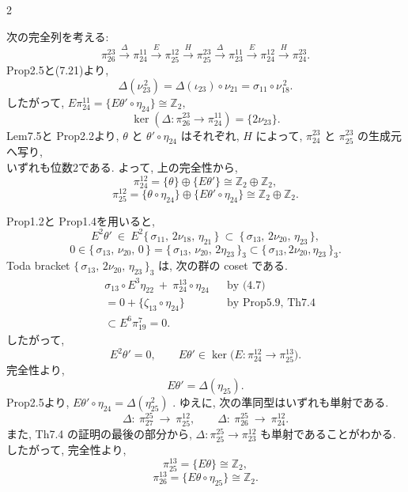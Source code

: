 \documentclass[10pt, leqno]{ltjsarticle}
\newcommand{\Ex}{E}        %
\newcommand{\toda}[1]{\{\,#1\,\}}              %
\newcommand{\todai}[2][]{\{\,#2\,\}_{#1}}      %
\newcommand{\gen}[1]{\{#1\}}       %
\newcommand{\pit}[2]{\pi_{#1}^{#2}}
\numberwithin{equation}{section}
\theoremstyle{plain}
\theoremstyle{definition}
\theoremstyle{remark}
\begin{document}
\begin{paracol}{2}

\noindent
次の完全列を考える:
\[
\pi_{26}^{23}\xrightarrow{\ \Delta\ }\pi_{24}^{11}\xrightarrow{\ \Ex\ }\pi_{25}^{12}
\xrightarrow{\ H\ }\pi_{25}^{23}\xrightarrow{\ \Delta\ }\pi_{23}^{11}
\xrightarrow{\ \Ex\ }\pi_{24}^{12}\xrightarrow{\ H\ }\pi_{24}^{23}.
\]
 Prop2.5と(7.21)より, 
\[
\Delta(\nu_{23}^{\,2})=\Delta(\iota_{23})\circ\nu_{21}=\sigma_{11}\circ\nu_{18}^{\,2}.
\]
したがって,
\(
\Ex\pi_{24}^{11}=\gen{\Ex\theta'\circ\eta_{24}}\cong\mathbb{Z}_2,
\)
\begin{equation}
\ker(\Delta:\pi_{26}^{23}\to\pi_{24}^{11})
= \gen{2\nu_{23}}.
\end{equation}
Lem7.5と Prop2.2より, \(\theta\) と \(\theta'\circ\eta_{24}\) はそれぞれ,
 \(H\) によって,
\(\pi_{24}^{23}\) と \(\pi_{25}^{23}\) の生成元へ写り, \\
いずれも位数2である. 
よって, 上の完全性から,
\[
\pi_{24}^{12}=\gen{\theta}\oplus\gen{\Ex\theta'}\cong\mathbb{Z}_2\oplus\mathbb{Z}_2,
\]
\[
\pi_{25}^{12}=\gen{\theta\circ\eta_{24}}\oplus\gen{\Ex\theta'\circ\eta_{24}}
\cong\mathbb{Z}_2\oplus\mathbb{Z}_2.
\]

 Prop1.2と Prop1.4を用いると,
\[
\Ex^{2}\theta'\ \in\ \Ex^{2}\toda{\sigma_{11},\,2\nu_{18},\,\eta_{21}}
\ \subset\ \toda{\sigma_{13},\,2\nu_{20},\,\eta_{23}},
\]
\[
0\in\toda{\sigma_{13},\,\nu_{20},\,0}
=\todai[3]{\sigma_{13},\,\nu_{20},\,2\eta_{23}}
\subset\todai[3]{\sigma_{13}, 2\nu_{20}, \eta_{23}}.
\]
Toda bracket  \(\todai[3]{\sigma_{13},\,2\nu_{20},\,\eta_{23}}\) は,
次の群の coset である.
\[
\begin{align*}
& \sigma_{13}\circ \Ex^{3}\eta_{22}\ +\ \pi_{24}^{13}\circ\eta_{24}
&& \text{by (4.7)} \\
& = 0 + \gen{\zeta_{13}\circ\eta_{24}}
&& \text{by Prop5.9, Th7.4}\\
& \subset E^6\pit{19}{7} = 0.
\end{align*}
\]
したがって,
\[
\Ex^{2}\theta'=0,\qquad
\Ex\theta'\in\ker\!\bigl(\Ex:\pi_{24}^{12}\to\pi_{25}^{13}\bigr).
\]
完全性より,
\[
\Ex\theta'=\Delta(\eta_{25}).
\]
Prop2.5より, \(\Ex\theta'\circ\eta_{24}=\Delta(\eta_{25}^{2})\) . 
ゆえに, 次の準同型はいずれも単射である.
\[
\Delta:\ \pi_{27}^{25}\ \longrightarrow\ \pi_{25}^{12},\qquad
\Delta:\ \pi_{26}^{25}\ \longrightarrow\ \pi_{24}^{12}.
\]
また, Th7.4 の証明の最後の部分から,
\(\Delta:\pi_{25}^{25}\to\pi_{23}^{12}\) も単射であることがわかる. \\
したがって, 完全性より,
\[
\pi_{25}^{13}=\gen{\Ex\theta}\cong\mathbb{Z}_2,
\]
\[
\pi_{26}^{13}=\gen{\Ex\theta\circ\eta_{25}}\cong\mathbb{Z}_2.
\]


\end{paracol}
\end{document}
